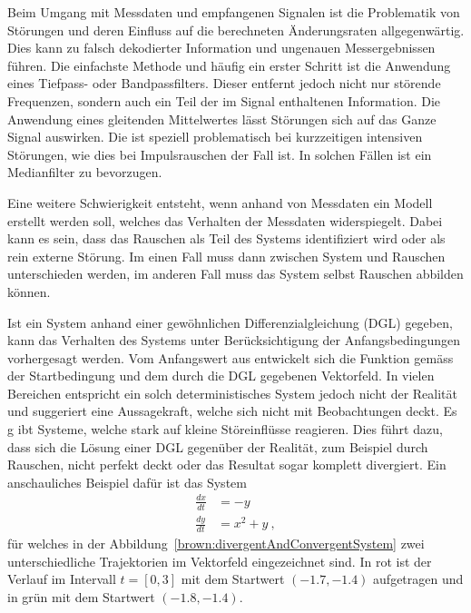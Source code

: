 Beim Umgang mit Messdaten und empfangenen Signalen ist die Problematik von Störungen und deren Einfluss auf die berechneten Änderungsraten allgegenwärtig. Dies  kann zu falsch dekodierter Information und ungenauen Messergebnissen führen. Die einfachste Methode und häufig ein erster Schritt ist die Anwendung eines Tiefpass- oder Bandpassfilters. Dieser entfernt jedoch nicht nur störende Frequenzen, sondern auch ein Teil der im Signal enthaltenen Information. Die Anwendung eines gleitenden Mittelwertes lässt Störungen sich auf das Ganze Signal auswirken. Die ist speziell problematisch bei kurzzeitigen intensiven Störungen, wie dies bei Impulsrauschen der Fall ist. In solchen Fällen ist ein Medianfilter zu bevorzugen.

Eine weitere Schwierigkeit entsteht, wenn anhand von Messdaten ein Modell erstellt werden soll, welches das Verhalten der Messdaten widerspiegelt. Dabei kann es sein, dass das Rauschen als Teil des Systems identifiziert wird oder als rein externe Störung. Im einen Fall muss dann zwischen System und Rauschen unterschieden werden, im anderen Fall muss das System selbst Rauschen abbilden können.

Ist ein System anhand einer gewöhnlichen Differenzialgleichung (DGL) gegeben, kann das Verhalten des Systems unter Berücksichtigung der Anfangsbedingungen vorhergesagt werden. Vom Anfangswert aus entwickelt sich die Funktion gemäss der Startbedingung und dem durch die DGL gegebenen Vektorfeld. In vielen Bereichen entspricht ein solch deterministisches System jedoch nicht der Realität und suggeriert eine Aussagekraft, welche sich nicht mit Beobachtungen deckt. Es g
ibt Systeme, welche stark auf kleine Störeinflüsse reagieren. Dies führt dazu, dass sich die Lösung einer DGL gegenüber der Realität, zum Beispiel durch Rauschen, nicht perfekt deckt oder das Resultat sogar komplett divergiert. Ein anschauliches Beispiel dafür ist das System
\begin{align}
	\frac{dx}{dt} &= -y \\
	\frac{dy}{dt} &= x^2 + y
	\label{brown:divergentEquation} \ ,
\end{align}
für welches in der Abbildung~\ref{brown:divergentAndConvergentSystem} zwei unterschiedliche Trajektorien im Vektorfeld eingezeichnet sind. In rot ist der Verlauf im Intervall  $ t = [0, 3] $ mit dem Startwert $ (-1.7, -1.4) $ aufgetragen und in grün mit dem Startwert $ (-1.8, -1.4) $.

